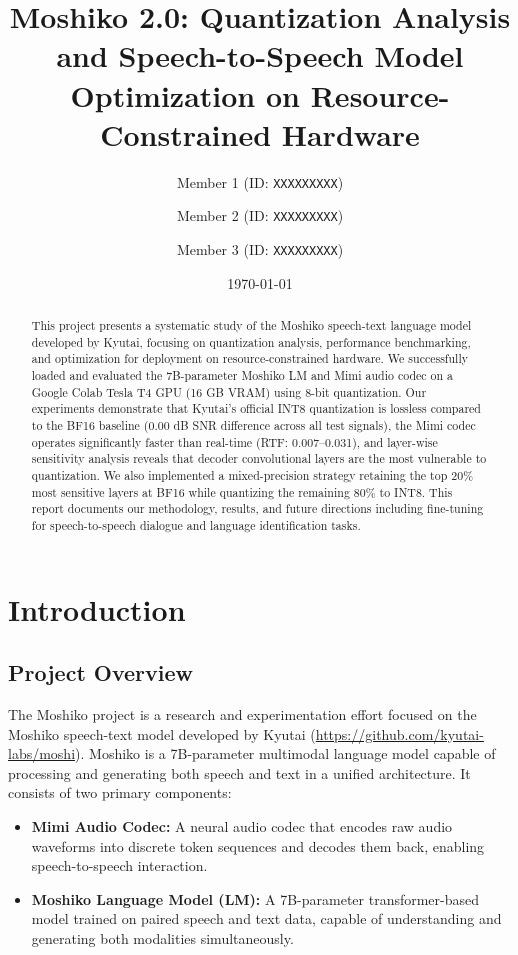 \documentclass[12pt,a4paper]{report}
\title{\textbf{Moshiko 2.0: Quantization Analysis and Speech-to-Speech Model Optimization on Resource-Constrained Hardware}}
\author{
    Member 1 (ID: \texttt{XXXXXXXXX}) \and
    Member 2 (ID: \texttt{XXXXXXXXX}) \and
    Member 3 (ID: \texttt{XXXXXXXXX})
}
\date{\today}
\begin{document}
\maketitle

\begin{abstract}
This project presents a systematic study of the Moshiko speech-text language model developed by Kyutai, focusing on quantization analysis, performance benchmarking, and optimization for deployment on resource-constrained hardware. We successfully loaded and evaluated the 7B-parameter Moshiko LM and Mimi audio codec on a Google Colab Tesla T4 GPU (16 GB VRAM) using 8-bit quantization. Our experiments demonstrate that Kyutai's official INT8 quantization is lossless compared to the BF16 baseline (0.00 dB SNR difference across all test signals), the Mimi codec operates significantly faster than real-time (RTF: 0.007--0.031), and layer-wise sensitivity analysis reveals that decoder convolutional layers are the most vulnerable to quantization. We also implemented a mixed-precision strategy retaining the top 20\% most sensitive layers at BF16 while quantizing the remaining 80\% to INT8. This report documents our methodology, results, and future directions including fine-tuning for speech-to-speech dialogue and language identification tasks.
\end{abstract}

\tableofcontents

\chapter{Introduction}

\section{Project Overview}
The Moshiko project is a research and experimentation effort focused on the Moshiko speech-text model developed by Kyutai (\url{https://github.com/kyutai-labs/moshi}). Moshiko is a 7B-parameter multimodal language model capable of processing and generating both speech and text in a unified architecture. It consists of two primary components:

\begin{itemize}
    \item \textbf{Mimi Audio Codec:} A neural audio codec that encodes raw audio waveforms into discrete token sequences and decodes them back, enabling speech-to-speech interaction.
    \item \textbf{Moshiko Language Model (LM):} A 7B-parameter transformer-based model trained on paired speech and text data, capable of understanding and generating both modalities simultaneously.
\end{itemize}
\end{document}

